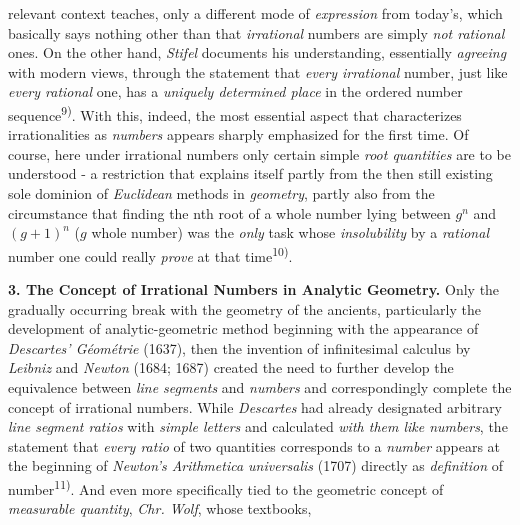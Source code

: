 \thispagestyle{fancy}

\vspace{0.5cm}

relevant context teaches, only a different mode of \textit{expression} from today's, which basically says nothing other than that \textit{irrational} numbers are simply \textit{not rational} ones. On the other hand, \textit{Stifel} documents his understanding, essentially \textit{agreeing} with modern views, through the statement that \textit{every irrational} number, just like \textit{every rational} one, has a \textit{uniquely determined place} in the ordered number sequence\textsuperscript{9)}. With this, indeed, the most essential aspect that characterizes irrationalities as \textit{numbers} appears sharply emphasized for the first time. Of course, here under irrational numbers only certain simple \textit{root quantities} are to be understood - a restriction that explains itself partly from the then still existing sole dominion of \textit{Euclidean} methods in \textit{geometry}, partly also from the circumstance that finding the nth root of a whole number lying between $g^n$ and $(g + 1)^n$ ($g$ whole number) was the \textit{only} task whose \textit{insolubility} by a \textit{rational} number one could really \textit{prove} at that time\textsuperscript{10)}.

\vspace{0.5cm}

\textbf{3. The Concept of Irrational Numbers in Analytic Geometry.} Only the gradually occurring break with the geometry of the ancients, particularly the development of analytic-geometric method beginning with the appearance of \textit{Descartes' Géométrie} (1637), then the invention of infinitesimal calculus by \textit{Leibniz} and \textit{Newton} (1684; 1687) created the need to further develop the equivalence between \textit{line segments} and \textit{numbers} and correspondingly complete the concept of irrational numbers. While \textit{Descartes} had already designated arbitrary \textit{line segment ratios} with \textit{simple letters} and calculated \textit{with them like numbers}, the statement that \textit{every ratio} of two quantities corresponds to a \textit{number} appears at the beginning of \textit{Newton's Arithmetica universalis} (1707) directly as \textit{definition} of number\textsuperscript{11)}. And even more specifically tied to the geometric concept of \textit{measurable quantity}, \textit{Chr. Wolf}, whose textbooks,

